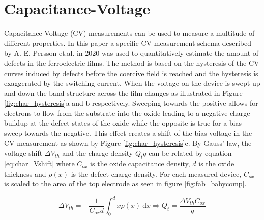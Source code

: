 \documentclass[11pt,twoside,final]{eitExjobb}  %
\begin{document}
\section{Capacitance-Voltage}\label{sec:CV}
Capacitance-Voltage (CV) measurements can be used to measure a multitude of
different properties. In this paper a specific CV measurement schema described
by A. E. Persson et.al. in 2020 was used to quantitatively estimate the amount
of defects in the ferroelectric films. \cite{persson2020method} The method is
based on the hysteresis of the CV curves induced by defects before the coercive
field is reached and the hysteresis is exaggerated by the switching current.
When the voltage on the device is swept up and down the band structure across
the film changes as illustrated in Figure \ref{fig:char_hysteresis}a and b
respectively. Sweeping towards the positive allows for electrons to flow from
the  substrate into the oxide leading to a negative charge buildup at
the defect states of the oxide while the opposite is true for a bias sweep
towards the negative. This effect creates a shift of the bias voltage in the CV
measurement as shown by Figure \ref{fig:char_hysteresis}c. By Gauss' law, the
voltage shift $\Delta V_{th}$ and the charge density $Q_t q$ can be related by
equation \ref{eq:char_Vshift} where $C_{ox}$ is the oxide capacitance density,
$d$ is the oxide thickness and $\rho(x)$ is the defect charge density. For each
measured device, $C_{ox}$ is scaled to the area of the top electrode as seen in
figure \ref{fig:fab_babycomp}.

\begin{equation}\label{eq:char_Vshift}
    \Delta V_{th} = - \frac{1}{C_{ox}d} \int_0^d x\rho(x)\ \mathrm{d}x
    \Longrightarrow Q_t = \frac{\Delta V_{th}C_{ox}}{q}
\end{equation}
\end{document}
